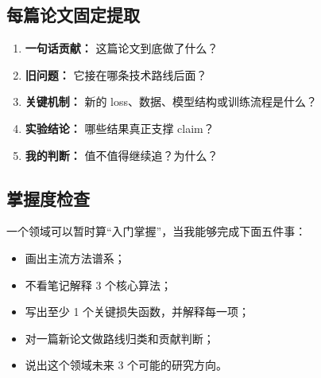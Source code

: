 \subsection{每篇论文固定提取}

\begin{enumerate}[leftmargin=1.5em]
  \item \textbf{一句话贡献：} 这篇论文到底做了什么？
  \item \textbf{旧问题：} 它接在哪条技术路线后面？
  \item \textbf{关键机制：} 新的 loss、数据、模型结构或训练流程是什么？
  \item \textbf{实验结论：} 哪些结果真正支撑 claim？
  \item \textbf{我的判断：} 值不值得继续追？为什么？
\end{enumerate}

\subsection{掌握度检查}

\begin{summarybox}
一个领域可以暂时算“入门掌握”，当我能够完成下面五件事：
\begin{itemize}[leftmargin=1.5em]
  \item 画出主流方法谱系；
  \item 不看笔记解释 3 个核心算法；
  \item 写出至少 1 个关键损失函数，并解释每一项；
  \item 对一篇新论文做路线归类和贡献判断；
  \item 说出这个领域未来 3 个可能的研究方向。
\end{itemize}
\end{summarybox}
